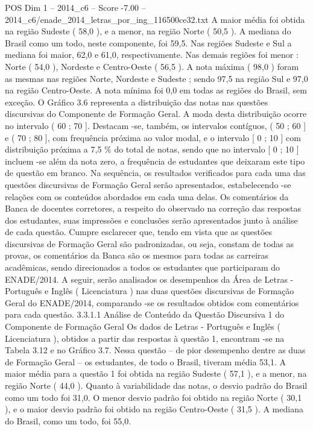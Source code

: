 \begin{textsample}{POS Dim 1 – 2014\_c6 – Score -7.00 – 2014\_c6/enade\_2014\_letras\_por\_ing\_116500ce32.txt}
A maior média foi obtida na região Sudeste ( 58,0 ), e a menor, na região Norte ( 50,5 ).
A mediana do Brasil como um todo, neste componente, foi 59,5.
Nas regiões Sudeste e Sul a mediana foi maior, 62,0 e 61,0, respectivamente.
Nas demais regiões foi menor : Norte ( 54,0 ), Nordeste e Centro-Oeste ( 56,5 ).
A nota máxima ( 98,0 ) foram as mesmas nas regiões Norte, Nordeste e Sudeste ; sendo 97,5 na região Sul e 97,0 na região Centro-Oeste.
A nota mínima foi 0,0 em todas as regiões do Brasil, sem exceção.
O Gráfico 3.6 representa a distribuição das notas nas questões discursivas do Componente de Formação Geral.
A moda desta distribuição ocorre no intervalo ( 60 ; 70 ].
Destacam -se, também, os intervalos contíguos, ( 50 ; 60 ] e ( 70 ; 80 ], com frequência próxima ao valor modal, e o intervalo [ 0 ; 10 ] com distribuição próxima a 7,5 \% do total de notas, sendo que no intervalo [ 0 ; 10 ] incluem -se além da nota zero, a frequência de estudantes que deixaram este tipo de questão em branco.
Na sequência, os resultados verificados para cada uma das questões discursivas de Formação Geral serão apresentados, estabelecendo -se relações com os conteúdos abordados em cada uma delas.
Os comentários da Banca de docentes corretores, a respeito do observado na correção das respostas dos estudantes, suas impressões e conclusões serão apresentados junto à análise de cada questão.
Cumpre esclarecer que, tendo em vista que as questões discursivas de Formação Geral são padronizadas, ou seja, constam de todas as provas, os comentários da Banca são os mesmos para todas as carreiras acadêmicas, sendo direcionados a todos os estudantes que participaram do ENADE/2014.
A seguir, serão analisados os desempenhos da Área de Letras - Português e Inglês ( Licenciatura ) nas duas questões discursivas de Formação Geral do ENADE/2014, comparando -se os resultados obtidos com comentários para cada questão. 3.3.1.1 Análise de Conteúdo da Questão Discursiva 1 do Componente de Formação Geral Os dados de Letras - Português e Inglês ( Licenciatura ), obtidos a partir das respostas à questão 1, encontram -se na Tabela 3.12 e no Gráfico 3.7.
Nessa questão – de pior desempenho dentre as duas de Formação Geral – os estudantes, de todo o Brasil, tiveram média 53,1.
A maior média para a questão 1 foi obtida na região Sudeste ( 57,1 ), e a menor, na região Norte ( 44,0 ).
Quanto à variabilidade das notas, o desvio padrão do Brasil como um todo foi 31,0.
O menor desvio padrão foi obtido na região Norte ( 30,1 ), e o maior desvio padrão foi obtido na região Centro-Oeste ( 31,5 ).
A mediana do Brasil, como um todo, foi 55,0.

\end{textsample}
